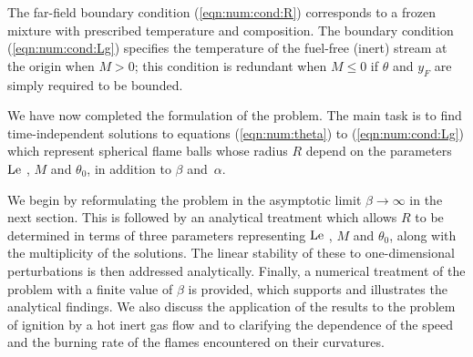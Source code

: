 The far-field boundary condition (\ref{eqn:num:cond:R}) corresponds
to a frozen mixture with prescribed temperature and composition. The
boundary condition (\ref{eqn:num:cond:Lg}) specifies the temperature
of the fuel-free (inert) stream at the origin when $M>0$; this
condition is redundant when $M \leq 0$ if $\theta$ and $y_F$ are
simply required  to be bounded.

We have now completed the formulation of the problem. The main task
is to find time-independent solutions to equations
(\ref{eqn:num:theta}) to (\ref{eqn:num:cond:Lg})  which represent spherical
flame balls  whose radius $R$ depend on the parameters $\text{Le }$, $M$
and $\theta_0$,  in addition to $\beta$ and~$\alpha$.


We begin by reformulating the problem in the asymptotic limit $\beta
\rightarrow \infty$ in the next section. This is followed by an
analytical treatment  which allows $R$ to be determined in terms  of three parameters representing $\text{Le }$, $M$ and $\theta_0$, along with
the multiplicity of the solutions. The linear stability of these to one-dimensional perturbations
is then addressed analytically. Finally, a numerical treatment
of the problem with a finite value of $\beta$ is provided, which supports and illustrates the analytical findings.  We also
discuss the application of the  results to the problem of ignition by a hot inert gas flow  and to clarifying
the dependence of the speed and the burning rate of the  flames encountered on their curvatures. 